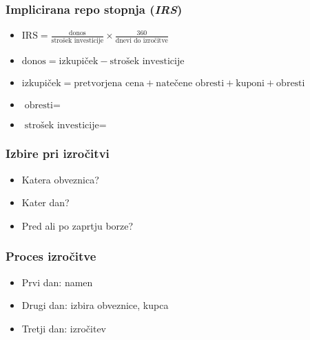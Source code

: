 \documentclass[14pt]{beamer}
\begin{document}
\begin{frame}
    \frametitle{Implicirana repo stopnja (\textit{IRS})}
    
    \begin{itemize}
        \item $ \text{IRS} = \frac{\text{donos}}{\text{strošek investicije}} 
                \times \frac{360}{\text{dnevi do izročitve}} $
        \item $ \text{donos} = \text{izkupiček} - \text{strošek investicije} $
        \item $ \text{izkupiček} = \text{pretvorjena cena} + \text{natečene obresti} 
                + \text{kuponi} + \text{obresti} $
        \item $ \text{obresti} =  $
        \item $ \text{strošek investicije} =  $
    \end{itemize}


\end{frame}


\begin{frame}
    \frametitle{Izbire pri izročitvi}
    
    \begin{itemize}
        \item Katera obveznica?
        \item Kater dan?
        \item Pred ali po zaprtju borze?
    \end{itemize}


\end{frame}


\begin{frame}
    \frametitle{Proces izročitve}
    
    \begin{itemize}
        \item Prvi dan: namen
        \item Drugi dan: izbira obveznice, kupca
        \item Tretji dan: izročitev
    \end{itemize}


\end{frame}
\end{document}
